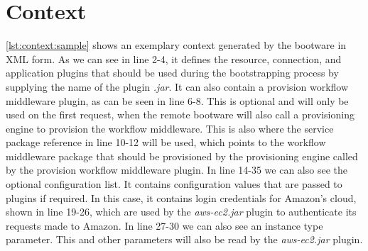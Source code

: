 \section{Context}
\label{implementation:context}

\vspace*{\baselineskip}

\autoref{lst:context:sample} shows an exemplary context generated by the bootware in XML form.
As we can see in line 2-4, it defines the resource, connection, and application plugins that should be used during the bootstrapping process by supplying the name of the plugin \textit{.jar}.
It can also contain a provision workflow middleware plugin, as can be seen in line 6-8.
This is optional and will only be used on the first request, when the remote bootware will also call a provisioning engine to provision the workflow middleware.
This is also where the service package reference in line 10-12 will be used, which points to the workflow middleware package that should be provisioned by the provisioning engine called by the provision workflow middleware plugin.
In line 14-35 we can also see the optional configuration list.
It contains configuration values that are passed to plugins if required.
In this case, it contains login credentials for Amazon's cloud, shown in line 19-26, which are used by the \textit{aws-ec2.jar} plugin to authenticate its requests made to Amazon.
In line 27-30 we can also see an instance type parameter.
This and other parameters will also be read by the \textit{aws-ec2.jar} plugin.
